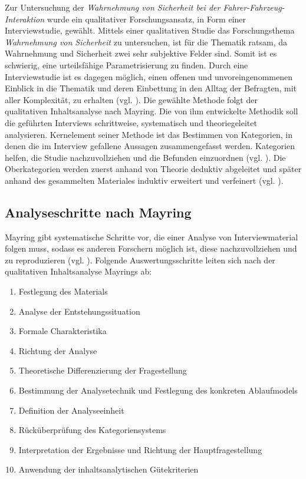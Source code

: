 \documentclass[12pt]{article}
\begin{document}
Zur Untersuchung der \emph{Wahrnehmung von Sicherheit bei der Fahrer-Fahrzeug-Interaktion} wurde ein qualitativer Forschungsansatz, in Form einer Interviewstudie, gewählt. Mittels einer qualitativen Studie das Forschungsthema \emph{Wahrnehmung von Sicherheit} zu untersuchen, ist für die Thematik ratsam, da Wahrnehmung und Sicherheit zwei sehr subjektive Felder sind. Somit ist es schwierig, eine urteilsfähige Parametrisierung zu finden. Durch eine Interviewstudie ist es dagegen möglich, einen offenen und unvoreingenommenen Einblick in die Thematik und deren Einbettung in den Alltag der Befragten, mit aller Komplexität, zu erhalten (vgl. \cite[14]{flick1995qualitative}).
Die gewählte Methode folgt der qualitativen Inhaltsanalyse nach Mayring. Die von ihm entwickelte Methodik soll die geführten Interviews schrittweise, systematisch und theoriegeleitet analysieren. Kernelement seiner Methode ist das Bestimmen von Kategorien, in denen die im Interview gefallene Aussagen zusammengefasst werden. Kategorien helfen, \glqq die Studie nachzuvollziehen und die Befunden einzuordnen\grqq{} (vgl. \cite[36]{meyen2011qualitative}). Die Oberkategorien werden zuerst anhand von Theorie deduktiv abgeleitet und später anhand des gesammelten Materiales induktiv erweitert und verfeinert (vgl. \cite[13]{mayring2010qualitative}).

\subsection*{Analyseschritte nach Mayring}

Mayring gibt systematische Schritte vor, die einer Analyse von Interviewmaterial folgen muss, sodass es anderen Forschern möglich ist, diese nachzuvollziehen und zu reproduzieren (vgl. \cite[54]{mayring2010qualitative}). Folgende Auswertungsschritte leiten sich nach der qualitativen Inhaltsanalyse Mayrings ab:

\begin{enumerate}
  \item Festlegung des Materials
  \item Analyse der Entstehungssituation
  \item Formale Charakteristika
  \item Richtung der Analyse
  \item Theoretische Differenzierung der Fragestellung
  \item Bestimmung der Analysetechnik und Festlegung des konkreten Ablaufmodels
  \item Definition der Analyseeinheit
  \item Rücküberprüfung des Kategoriensystems
  \item Interpretation der Ergebnisse und Richtung der Hauptfragestellung
  \item Anwendung der inhaltsanalytischen Gütekriterien
\end{enumerate}
\end{document}
